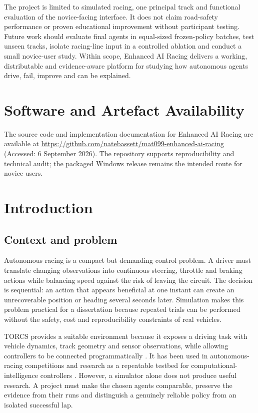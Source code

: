 The project is limited to simulated racing, one principal track and functional evaluation of the novice-facing interface. It does not claim road-safety performance or proven educational improvement without participant testing. Future work should evaluate final agents in equal-sized frozen-policy batches, test unseen tracks, isolate racing-line input in a controlled ablation and conduct a small novice-user study. Within scope, Enhanced AI Racing delivers a working, distributable and evidence-aware platform for studying how autonomous agents drive, fail, improve and can be explained.

\section*{Software and Artefact Availability}

The source code and implementation documentation for Enhanced AI Racing are available at \url{https://github.com/natebassett/mat099-enhanced-ai-racing} (Accessed: 6 September 2026). The repository supports reproducibility and technical audit; the packaged Windows release remains the intended route for novice users.

\tableofcontents
\listoffigures
\listoftables

\clearpage
{}

\section{Introduction}
\label{ch:introduction}

\subsection{Context and problem}

Autonomous racing is a compact but demanding control problem. A driver must translate changing observations into continuous steering, throttle and braking actions while balancing speed against the risk of leaving the circuit. The decision is sequential: an action that appears beneficial at one instant can create an unrecoverable position or heading several seconds later. Simulation makes this problem practical for a dissertation because repeated trials can be performed without the safety, cost and reproducibility constraints of real vehicles.

TORCS provides a suitable environment because it exposes a driving task with vehicle dynamics, track geometry and sensor observations, while allowing controllers to be connected programmatically \parencite{torcs2026}. It has been used in autonomous-racing competitions and research as a repeatable testbed for computational-intelligence controllers \parencite{loiacono2010}. However, a simulator alone does not produce useful research. A project must make the chosen agents comparable, preserve the evidence from their runs and distinguish a genuinely reliable policy from an isolated successful lap.

